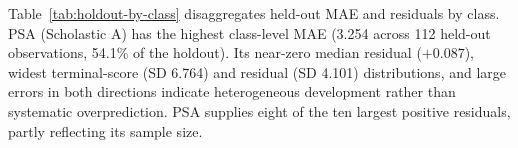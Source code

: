 

Table~\ref{tab:holdout-by-class} disaggregates held-out MAE and residuals by
class. PSA (Scholastic A) has the highest class-level MAE (3.254 across 112
held-out observations, 54.1\% of the holdout). Its near-zero median residual
($+0.087$), widest terminal-score (SD 6.764) and residual (SD 4.101)
distributions, and large errors in both directions indicate heterogeneous
development rather than systematic overprediction. PSA supplies eight of the
ten largest positive residuals, partly reflecting its sample size.


